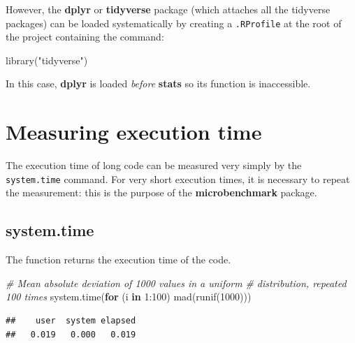 \documentclass[
  12pt,
  american,
  a4paper,
  extrafontsizes,onecolumn,openright
  ]{memoir}
\newenvironment{Shaded}{\begin{snugshade}}{\end{snugshade}}
\newcommand{\CommentTok}[1]{\textcolor[rgb]{0.56,0.35,0.01}{\textit{#1}}}
\newcommand{\ControlFlowTok}[1]{\textcolor[rgb]{0.13,0.29,0.53}{\textbf{#1}}}
\newcommand{\DecValTok}[1]{\textcolor[rgb]{0.00,0.00,0.81}{#1}}
\newcommand{\FunctionTok}[1]{\textcolor[rgb]{0.00,0.00,0.00}{#1}}
\newcommand{\NormalTok}[1]{#1}
\newcommand{\SpecialCharTok}[1]{\textcolor[rgb]{0.00,0.00,0.00}{#1}}
\newcommand{\StringTok}[1]{\textcolor[rgb]{0.31,0.60,0.02}{#1}}
\begin{document}
However, the \textbf{dplyr} or \textbf{tidyverse} package (which attaches all the tidyverse packages) can be loaded systematically by creating a \texttt{.RProfile} at the root of the project containing the command:

\scriptsize

\begin{Shaded}
\begin{Highlighting}[]
\FunctionTok{library}\NormalTok{(}\StringTok{"tidyverse"}\NormalTok{)}
\end{Highlighting}
\end{Shaded}

\normalsize

In this case, \textbf{dplyr} is loaded \emph{before} \textbf{stats} so its function is inaccessible.

\hypertarget{measuring-execution-time}{%
\section{Measuring execution time}\label{measuring-execution-time}}

The execution time of long code can be measured very simply by the \texttt{system.time} command.
For very short execution times, it is necessary to repeat the measurement: this is the purpose of the \textbf{microbenchmark} package.

\hypertarget{system.time}{%
\subsection{system.time}\label{system.time}}

The function returns the execution time of the code.

\scriptsize

\begin{Shaded}
\begin{Highlighting}[]
\CommentTok{\# Mean absolute deviation of 1000 values in a uniform}
\CommentTok{\# distribution, repeated 100 times}
\FunctionTok{system.time}\NormalTok{(}\ControlFlowTok{for}\NormalTok{ (i }\ControlFlowTok{in} \DecValTok{1}\SpecialCharTok{:}\DecValTok{100}\NormalTok{) }\FunctionTok{mad}\NormalTok{(}\FunctionTok{runif}\NormalTok{(}\DecValTok{1000}\NormalTok{)))}
\end{Highlighting}
\end{Shaded}

\begin{verbatim}
##    user  system elapsed 
##   0.019   0.000   0.019
\end{verbatim}
\end{document}
